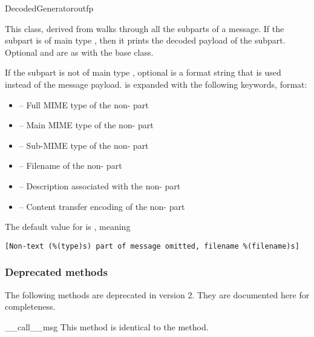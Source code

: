 \begin{classdesc}{DecodedGenerator}{outfp}

This class, derived from  walks through all the
subparts of a message.  If the subpart is of main type
, then it prints the decoded payload of the subpart.
Optional  and  are as with the
 base class.

If the subpart is not of main type , optional 
is a format string that is used instead of the message payload.
 is expanded with the following keywords, 
format:

\begin{itemize}
\item {} -- Full MIME type of the non- part

\item {} -- Main MIME type of the non- part

\item {} -- Sub-MIME type of the non- part

\item {} -- Filename of the non- part

\item {} -- Description associated with the
      non- part

\item {} -- Content transfer encoding of the
      non- part

\end{itemize}

The default value for  is , meaning

\begin{verbatim}
[Non-text (%(type)s) part of message omitted, filename %(filename)s]
\end{verbatim}

\end{classdesc}

\subsubsection{Deprecated methods}

The following methods are deprecated in  version 2.
They are documented here for completeness.

\begin{methoddesc}[Generator]{__call__}{msg}
This method is identical to the  method.

\end{methoddesc}
